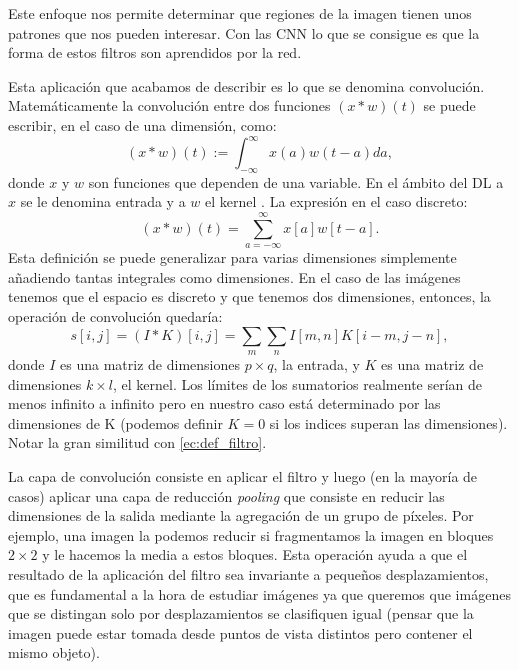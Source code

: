\documentclass[a4paper,12pt,twoside,titlepage]{article}
\begin{document}
Este enfoque nos permite determinar que regiones de la imagen tienen unos patrones que nos pueden interesar. Con las CNN lo que se consigue es que la forma de estos filtros son aprendidos por la red. 

Esta aplicación que acabamos de describir es lo que se denomina convolución. Matemáticamente la convolución entre dos funciones $(x * w)(t)$ se puede escribir, en el caso de una dimensión, como:
\begin{equation}
  (x * w)(t):=\int_{-\infty}^{\infty} x(a) w(t-a) d a,
\end{equation}
donde $x$ y $w$ son funciones que dependen de una variable. En el ámbito del DL a $x$ se le denomina entrada y a $w$ el kernel \cite{dl_book}. La expresión en el caso discreto:
\begin{equation}
  (x * w)(t)=\sum_{a=-\infty}^{\infty} x[a] w[t-a].
  \end{equation}
Esta definición se puede generalizar para varias dimensiones simplemente añadiendo tantas integrales como dimensiones. En el caso de las imágenes tenemos que el espacio es discreto y que tenemos dos dimensiones, entonces, la operación de convolución quedaría:
\begin{equation}
  s[i, j]=(I * K)[i, j]=\sum_{m} \sum_{n} I[m, n] K[i-m, j-n],
\end{equation}
donde $I$ es una matriz de dimensiones $p\times q$, la entrada, y $K$ es una matriz de dimensiones $k\times l$, el kernel. Los límites de los sumatorios realmente serían de menos infinito a infinito pero en nuestro caso está determinado por las dimensiones de K (podemos definir $K = 0$ si los indices superan las dimensiones). Notar la gran similitud con \ref{ec:def_filtro}.


La capa de convolución consiste en aplicar el filtro y luego (en la mayoría de casos) aplicar una capa de reducción \textit{pooling} que consiste en reducir las dimensiones de la salida mediante la agregación de un grupo de píxeles. Por ejemplo, una imagen la podemos reducir si fragmentamos la imagen en bloques $2\times 2$ y le hacemos la media a estos bloques. Esta operación ayuda a que el resultado de la aplicación del filtro sea invariante a pequeños desplazamientos, que es fundamental a la hora de estudiar imágenes ya que queremos que imágenes que se distingan solo por desplazamientos se clasifiquen igual (pensar que la imagen puede estar tomada desde puntos de vista distintos pero contener el mismo objeto).
\end{document}
